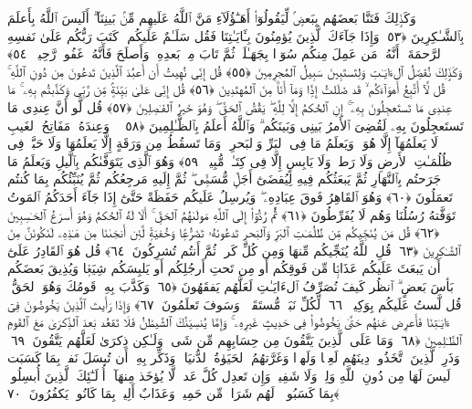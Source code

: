  وَكَذَٟلِكَ فَتَنَّا بَعضَهُم بِبَعضٍۢ لِّيَقُولُوٓا۟ أَهَـٰٓؤُلَآءِ مَنَّ ٱللَّهُ عَلَيهِم مِّنۢ بَينِنَآ ۗ أَلَيسَ ٱللَّهُ بِأَعلَمَ بِٱلشَّـٰكِرِينَ ﴿٥٣﴾
 وَإِذَا جَآءَكَ ٱلَّذِينَ يُؤمِنُونَ بِـَٔايَـٰتِنَا فَقُل سَلَـٰمٌ عَلَيكُم ۖ كَتَبَ رَبُّكُم عَلَىٰ نَفسِهِ ٱلرَّحمَةَ ۖ أَنَّهُۥ مَن عَمِلَ مِنكُم سُوٓءًۢا بِجَهَـٰلَةٍۢ ثُمَّ تَابَ مِنۢ بَعدِهِۦ وَأَصلَحَ فَأَنَّهُۥ غَفُورٌۭ رَّحِيمٌۭ ﴿٥٤﴾
 وَكَذَٟلِكَ نُفَصِّلُ ٱلءَايَـٰتِ وَلِتَستَبِينَ سَبِيلُ ٱلمُجرِمِينَ ﴿٥٥﴾
 قُل إِنِّى نُهِيتُ أَن أَعبُدَ ٱلَّذِينَ تَدعُونَ مِن دُونِ ٱللَّهِ ۚ قُل لَّآ أَتَّبِعُ أَهوَآءَكُم ۙ قَد ضَلَلتُ إِذًۭا وَمَآ أَنَا۠ مِنَ ٱلمُهتَدِينَ ﴿٥٦﴾
 قُل إِنِّى عَلَىٰ بَيِّنَةٍۢ مِّن رَّبِّى وَكَذَّبتُم بِهِۦ ۚ مَا عِندِى مَا تَستَعجِلُونَ بِهِۦٓ ۚ إِنِ ٱلحُكمُ إِلَّا لِلَّهِ ۖ يَقُصُّ ٱلحَقَّ ۖ وَهُوَ خَيرُ ٱلفَـٰصِلِينَ ﴿٥٧﴾
 قُل لَّو أَنَّ عِندِى مَا تَستَعجِلُونَ بِهِۦ لَقُضِىَ ٱلأَمرُ بَينِى وَبَينَكُم ۗ وَٱللَّهُ أَعلَمُ بِٱلظَّـٰلِمِينَ ﴿٥٨﴾
 ۞ وَعِندَهُۥ مَفَاتِحُ ٱلغَيبِ لَا يَعلَمُهَآ إِلَّا هُوَ ۚ وَيَعلَمُ مَا فِى ٱلبَرِّ وَٱلبَحرِ ۚ وَمَا تَسقُطُ مِن وَرَقَةٍ إِلَّا يَعلَمُهَا وَلَا حَبَّةٍۢ فِى ظُلُمَـٰتِ ٱلأَرضِ وَلَا رَطبٍۢ وَلَا يَابِسٍ إِلَّا فِى كِتَـٰبٍۢ مُّبِينٍۢ ﴿٥٩﴾
 وَهُوَ ٱلَّذِى يَتَوَفَّىٰكُم بِٱلَّيلِ وَيَعلَمُ مَا جَرَحتُم بِٱلنَّهَارِ ثُمَّ يَبعَثُكُم فِيهِ لِيُقضَىٰٓ أَجَلٌۭ مُّسَمًّۭى ۖ ثُمَّ إِلَيهِ مَرجِعُكُم ثُمَّ يُنَبِّئُكُم بِمَا كُنتُم تَعمَلُونَ ﴿٦٠﴾
 وَهُوَ ٱلقَاهِرُ فَوقَ عِبَادِهِۦ ۖ وَيُرسِلُ عَلَيكُم حَفَظَةً حَتَّىٰٓ إِذَا جَآءَ أَحَدَكُمُ ٱلمَوتُ تَوَفَّتهُ رُسُلُنَا وَهُم لَا يُفَرِّطُونَ ﴿٦١﴾
 ثُمَّ رُدُّوٓا۟ إِلَى ٱللَّهِ مَولَىٰهُمُ ٱلحَقِّ ۚ أَلَا لَهُ ٱلحُكمُ وَهُوَ أَسرَعُ ٱلحَـٰسِبِينَ ﴿٦٢﴾
 قُل مَن يُنَجِّيكُم مِّن ظُلُمَـٰتِ ٱلبَرِّ وَٱلبَحرِ تَدعُونَهُۥ تَضَرُّعًۭا وَخُفيَةًۭ لَّئِن أَنجَىٰنَا مِن هَـٰذِهِۦ لَنَكُونَنَّ مِنَ ٱلشَّـٰكِرِينَ ﴿٦٣﴾
 قُلِ ٱللَّهُ يُنَجِّيكُم مِّنهَا وَمِن كُلِّ كَربٍۢ ثُمَّ أَنتُم تُشرِكُونَ ﴿٦٤﴾
 قُل هُوَ ٱلقَادِرُ عَلَىٰٓ أَن يَبعَثَ عَلَيكُم عَذَابًۭا مِّن فَوقِكُم أَو مِن تَحتِ أَرجُلِكُم أَو يَلبِسَكُم شِيَعًۭا وَيُذِيقَ بَعضَكُم بَأسَ بَعضٍ ۗ ٱنظُر كَيفَ نُصَرِّفُ ٱلءَايَـٰتِ لَعَلَّهُم يَفقَهُونَ ﴿٦٥﴾
 وَكَذَّبَ بِهِۦ قَومُكَ وَهُوَ ٱلحَقُّ ۚ قُل لَّستُ عَلَيكُم بِوَكِيلٍۢ ﴿٦٦﴾
 لِّكُلِّ نَبَإٍۢ مُّستَقَرٌّۭ ۚ وَسَوفَ تَعلَمُونَ ﴿٦٧﴾
 وَإِذَا رَأَيتَ ٱلَّذِينَ يَخُوضُونَ فِىٓ ءَايَـٰتِنَا فَأَعرِض عَنهُم حَتَّىٰ يَخُوضُوا۟ فِى حَدِيثٍ غَيرِهِۦ ۚ وَإِمَّا يُنسِيَنَّكَ ٱلشَّيطَٰنُ فَلَا تَقعُد بَعدَ ٱلذِّكرَىٰ مَعَ ٱلقَومِ ٱلظَّـٰلِمِينَ ﴿٦٨﴾
 وَمَا عَلَى ٱلَّذِينَ يَتَّقُونَ مِن حِسَابِهِم مِّن شَىءٍۢ وَلَـٰكِن ذِكرَىٰ لَعَلَّهُم يَتَّقُونَ ﴿٦٩﴾
 وَذَرِ ٱلَّذِينَ ٱتَّخَذُوا۟ دِينَهُم لَعِبًۭا وَلَهوًۭا وَغَرَّتهُمُ ٱلحَيَوٰةُ ٱلدُّنيَا ۚ وَذَكِّر بِهِۦٓ أَن تُبسَلَ نَفسٌۢ بِمَا كَسَبَت لَيسَ لَهَا مِن دُونِ ٱللَّهِ وَلِىٌّۭ وَلَا شَفِيعٌۭ وَإِن تَعدِل كُلَّ عَدلٍۢ لَّا يُؤخَذ مِنهَآ ۗ أُو۟لَـٰٓئِكَ ٱلَّذِينَ أُبسِلُوا۟ بِمَا كَسَبُوا۟ ۖ لَهُم شَرَابٌۭ مِّن حَمِيمٍۢ وَعَذَابٌ أَلِيمٌۢ بِمَا كَانُوا۟ يَكفُرُونَ ﴿٧٠﴾
